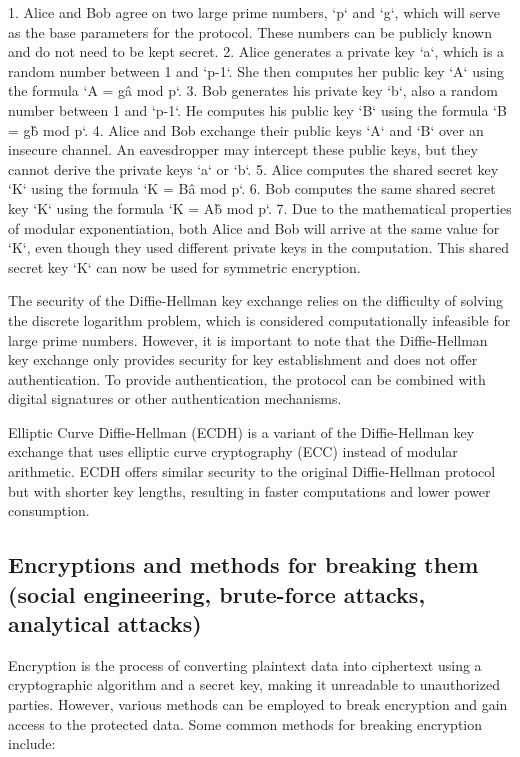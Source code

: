 \documentclass{article}
\begin{document}
1. Alice and Bob agree on two large prime numbers, `p` and `g`, which will serve as the base parameters for the protocol. These numbers can be publicly known and do not need to be kept secret.
2. Alice generates a private key `a`, which is a random number between 1 and `p-1`. She then computes her public key `A` using the formula `A = g\^a mod p`.
3. Bob generates his private key `b`, also a random number between 1 and `p-1`. He computes his public key `B` using the formula `B = g\^b mod p`.
4. Alice and Bob exchange their public keys `A` and `B` over an insecure channel. An eavesdropper may intercept these public keys, but they cannot derive the private keys `a` or `b`.
5. Alice computes the shared secret key `K` using the formula `K = B\^a mod p`.
6. Bob computes the same shared secret key `K` using the formula `K = A\^b mod p`.
7. Due to the mathematical properties of modular exponentiation, both Alice and Bob will arrive at the same value for `K`, even though they used different private keys in the computation. This shared secret key `K` can now be used for symmetric encryption.

The security of the Diffie-Hellman key exchange relies on the difficulty of solving the discrete logarithm problem, which is considered computationally infeasible for large prime numbers. However, it is important to note that the Diffie-Hellman key exchange only provides security for key establishment and does not offer authentication. To provide authentication, the protocol can be combined with digital signatures or other authentication mechanisms.

Elliptic Curve Diffie-Hellman (ECDH) is a variant of the Diffie-Hellman key exchange that uses elliptic curve cryptography (ECC) instead of modular arithmetic. ECDH offers similar security to the original Diffie-Hellman protocol but with shorter key lengths, resulting in faster computations and lower power consumption.


\subsection{Encryptions and methods for breaking them (social engineering, brute-force attacks, analytical attacks)}

Encryption is the process of converting plaintext data into ciphertext using a cryptographic algorithm and a secret key, making it unreadable to unauthorized parties. However, various methods can be employed to break encryption and gain access to the protected data. Some common methods for breaking encryption include:
\end{document}
